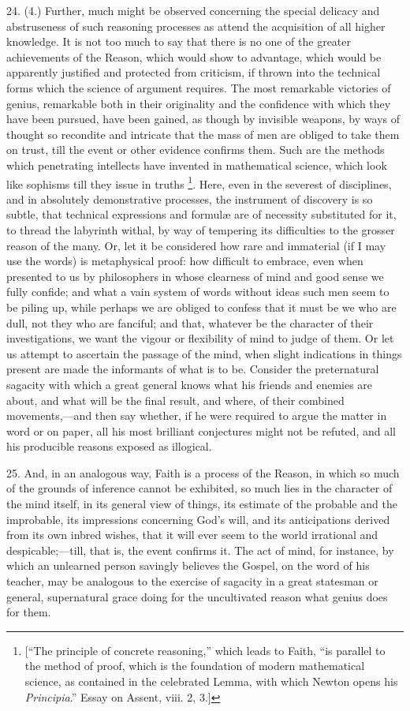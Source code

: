 24. (4.) Further, much might be observed concerning the special
delicacy and abstruseness of such reasoning processes as attend the
acquisition of all higher knowledge. It is not too much to say that
there is no one of the greater achievements of the Reason, which would
show to advantage, which would be apparently justified and protected
from criticism, if thrown into the technical forms which the science
of argument requires. The most remarkable victories of genius,
remarkable both in their originality and the confidence with which
they have been pursued, have been gained, as though by invisible
weapons, by ways of thought so recondite and intricate that the mass
of men are obliged to take them on trust, till the event or other
evidence confirms them. Such are the methods which penetrating
intellects have invented in mathematical science, which look like
sophisms till they issue in truths \footnote{[``The
principle of concrete reasoning,'' which leads to Faith, ``is
parallel to the method of proof, which is the foundation of modern
mathematical science, as contained in the celebrated Lemma, with which
Newton opens his \emph{Principia}.'' Essay on
Assent, viii. 2, 3.]}. Here, even in the severest of disciplines, and in absolutely
demonstrative processes, the instrument of discovery is so subtle,
that technical expressions and formulæ are of necessity substituted
for it, to thread the labyrinth withal, by way of tempering its
difficulties to the grosser reason of the many. Or, let it be
considered how rare and immaterial (if I may use the words) is
metaphysical proof: how difficult to embrace, even when presented to
us by philosophers in whose clearness of mind and good sense we fully
confide; and what a vain system of words without ideas such men seem
to be piling up, while perhaps we are obliged to confess that it must
be we who are dull, not they who are fanciful; and that, whatever be
the character of their investigations, we want the vigour or
flexibility of mind to judge of them. Or let us attempt to ascertain
the passage of the mind, when slight indications in things present are
made the informants of what is to be. Consider the preternatural
sagacity with which a great general knows what his friends and enemies
are about, and what will be the final result, and where, of their
combined movements,—and then say whether, if he were required to
argue the matter in word or on paper, all his most brilliant
conjectures might not be refuted, and all his producible reasons
exposed as illogical.

25. And, in an analogous way, Faith is a process of the Reason, in
which so much of the grounds of inference cannot be exhibited, so much
lies in the character of the mind itself, in its general view of
things, its estimate of the probable and the improbable, its
impressions concerning God's will, and its anticipations derived from
its own inbred wishes, that it will ever seem to the world irrational
and despicable;—till, that is, the event confirms it. The act of
mind, for instance, by which an unlearned person savingly believes the
Gospel, on the word of his teacher, may be analogous to the exercise
of sagacity in a great statesman or general, supernatural grace doing
for the uncultivated reason what genius does for them.


